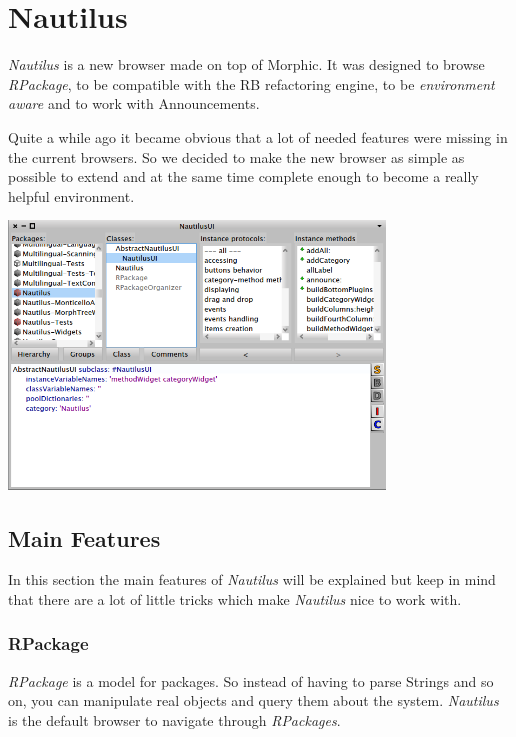 \documentclass[a4paper,10pt,twoside]{book}
\newcommand\nautilus{\emph{Nautilus}\xspace}
\begin{document}
	
\fi
\sloppy


\chapter{Nautilus}


\nautilus is a new browser made on top of Morphic. It was designed to browse \emph{RPackage}, to be compatible with the RB refactoring engine, to be \emph{environment aware} and to work with Announcements.

Quite a while ago it became obvious that a lot of needed features were missing in the current browsers. So we decided to make the new browser as simple as possible to extend and at the same time complete enough to become a really helpful environment.

\begin{center}
	\includegraphics[width=10cm]{figures/nautilus1}
	\label{fig:nautilus1}
\end{center}


\section{Main Features}

In this section the main features of \nautilus will be explained but keep in mind that there are a lot of little tricks which make \nautilus nice to work with.

\subsection*{RPackage}

\emph{RPackage} is a  model for packages. So instead of having to parse Strings and so on, you can manipulate real objects and query them about the system. \nautilus is the default browser to navigate through \emph{RPackages}.
\end{document}
